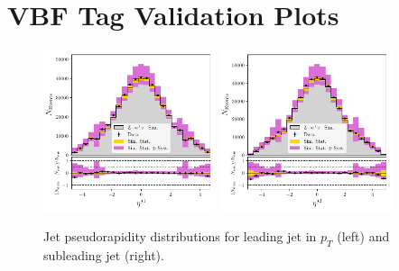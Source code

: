 

\chapter{VBF Tag \Zee Validation Plots}
\label{appendix:vbf_zee}



\begin{figure}[h!]
    \begin{center}
        \includegraphics[width=0.45\textwidth]{figures/appendix_zee/lead_jet_eta_zee_LPS.pdf}
        \includegraphics[width=0.45\textwidth]{figures/appendix_zee/sublead_jet_eta_zee_LPS.pdf}
    \end{center}
    \caption{Jet pseudorapidity distributions for leading jet in $p_T$ (left) and subleading jet (right).}
\end{figure}

